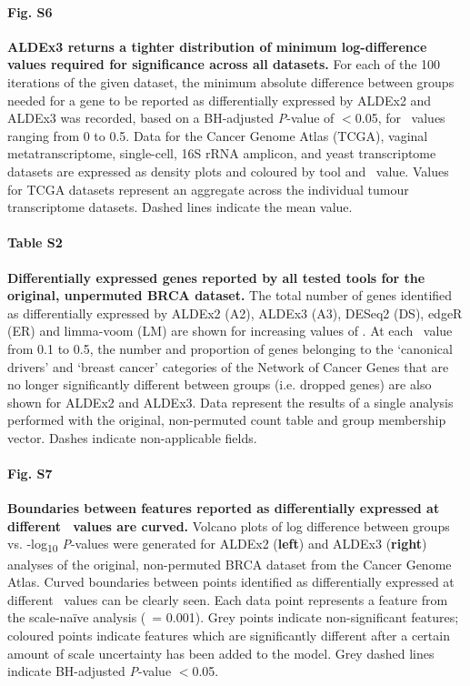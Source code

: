 \documentclass[10pt,letterpaper]{article}
\begin{document}
\paragraph*{Fig. S6}
\label{fig:supFigDensity}
\textbf{ALDEx3 returns a tighter distribution of minimum log-difference values required for significance across all datasets.} For each of the 100 iterations of the given dataset, the minimum absolute difference between groups needed for a gene to be reported as differentially expressed by ALDEx2 and ALDEx3 was recorded, based on a BH-adjusted \textit{P}-value of $<$0.05, for \textgamma~values ranging from 0 to 0.5. Data for the Cancer Genome Atlas (TCGA), vaginal metatranscriptome, single-cell, 16S rRNA amplicon, and yeast transcriptome datasets are expressed as density plots and coloured by tool and \textgamma~value. Values for TCGA datasets represent an aggregate across the individual tumour transcriptome datasets. Dashed lines indicate the mean value.

\paragraph*{Table S2}
\label{tab:sigGenesReal}
\textbf{Differentially expressed genes reported by all tested tools for the original, unpermuted BRCA dataset.} The total number of genes identified as differentially expressed by ALDEx2 (A2), ALDEx3 (A3), DESeq2 (DS), edgeR (ER) and limma-voom (LM) are shown for increasing values of \textgamma. At each \textgamma~value from 0.1 to 0.5, the number and proportion of genes belonging to the `canonical drivers' and `breast cancer' categories of the Network of Cancer Genes \cite{repana_network_2019} that are no longer significantly different between groups (i.e. dropped genes) are also shown for ALDEx2 and ALDEx3. Data represent the results of a single analysis performed with the original, non-permuted count table and group membership vector. Dashes indicate non-applicable fields. 

\paragraph*{Fig. S7}
\label{fig:supFigEffectUnperm}
\textbf{Boundaries between features reported as differentially expressed at different \textgamma~values are curved.} Volcano plots of log difference between groups vs. -log\textsubscript{10} \textit{P}-values were generated for ALDEx2 (\textbf{left}) and ALDEx3 (\textbf{right}) analyses of the original, non-permuted BRCA dataset from the Cancer Genome Atlas. Curved boundaries between points identified as differentially expressed at different \textgamma~values can be clearly seen. Each data point represents a feature from the scale-na\"ive analysis (\textgamma~= 0.001). Grey points indicate non-significant features; coloured points indicate features which are significantly different after a certain amount of scale uncertainty has been added to the model. Grey dashed lines indicate BH-adjusted \textit{P}-value $<$0.05.
\end{document}

